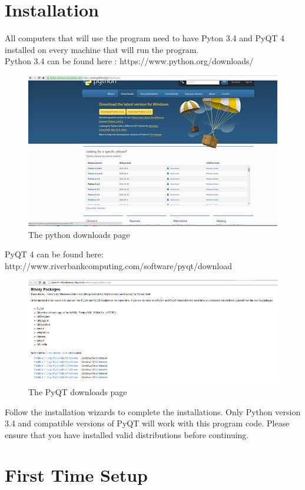\documentclass{report}
\begin{document}
\chapter{Installation}
 All computers that will use the program need to have Pyton 3.4 and PyQT 4 installed on every machine that will run the program.\\
 Python 3.4 can be found here : https://www.python.org/downloads/\\
\begin{figure}[h]
\centering
\includegraphics{PythonDownload}
\caption{The python downloads page}
\label{fig:pydownload}
\end{figure}
 \clearpage
 PyQT 4 can be found here: http://www.riverbankcomputing.com/software/pyqt/download\\
\begin{figure}[h]
\centering
\includegraphics{PyQTDownload}
\caption{The PyQT downloads page}
\label{fig:PyQTdownload}
\end{figure}
Follow the installation wizards to complete the installations.
Only Python version 3.4 and compatible versions of PyQT will work with this program code. Please ensure that you have installed valid distributions before continuing.\\
 
 
\chapter{First Time Setup}
\end{document}
